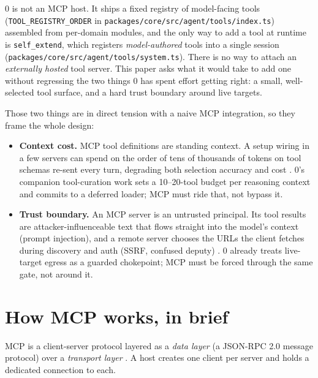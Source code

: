 \documentclass[11pt]{article}
\begin{document}
0 is not an MCP host. It ships a fixed registry of model-facing tools
(\texttt{TOOL\_REGISTRY\_ORDER} in
\texttt{packages/core/src/agent/tools/index.ts}) assembled from per-domain
modules, and the only way to add a tool at runtime is \texttt{self\_extend},
which registers \emph{model-authored} tools into a single session
(\texttt{packages/core/src/agent/tools/system.ts}). There is no way to attach an
\emph{externally hosted} tool server. This paper asks what it would take to add
one without regressing the two things 0 has spent effort getting right: a
small, well-selected tool surface, and a hard trust boundary around live
targets.

Those two things are in direct tension with a naive MCP integration, so they
frame the whole design:

\begin{itemize}[leftmargin=*]
  \item \textbf{Context cost.} MCP tool definitions are standing context. A
  setup wiring in a few servers can spend on the order of tens of thousands of
  tokens on tool schemas re-sent every turn, degrading both selection accuracy
  and cost \cite{mcp-clientbp,anthropic-toolsearch}. 0's companion
  tool-curation work \cite{tool-curation} sets a 10--20-tool budget per
  reasoning context and commits to a deferred loader; MCP must ride that, not
  bypass it.
  \item \textbf{Trust boundary.} An MCP server is an untrusted principal. Its
  tool results are attacker-influenceable text that flows straight into the
  model's context (prompt injection), and a remote server chooses the URLs the
  client fetches during discovery and auth (SSRF, confused deputy)
  \cite{mcp-security}. 0 already treats live-target egress as a guarded
  chokepoint; MCP must be forced through the same gate, not around it.
\end{itemize}

\section{How MCP works, in brief}

MCP is a client-server protocol layered as a \emph{data layer} (a JSON-RPC 2.0
message protocol) over a \emph{transport layer} \cite{mcp-arch}. A host creates
one client per server and holds a dedicated connection to each.
\end{document}
